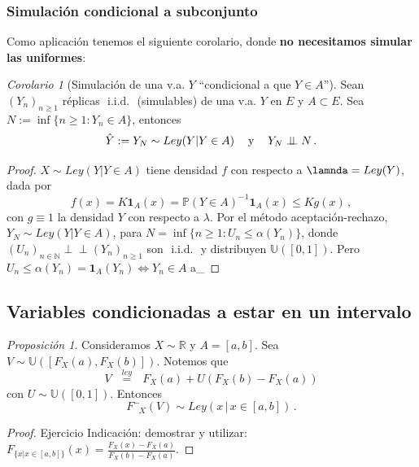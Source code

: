 \documentclass[letterpaper,11pt]{article} %
\def\espacio{\hspace{.25cm}\,}
\theoremstyle{defbreak}
\theoremstyle{propbreak}
\theoremstyle{remark}
\theoremstyle{break}
\newtheorem{proposition}{Proposición}[subsection]
\newtheorem{corolary}{Corolario}[subsection]
\def\R{\mathbb{R}}
\def\P{\mathbb{P}}
\def\N{\mathbb{N}}
\def\unif{\mathbb{U}([0,1])}
\newcommand{\indep}{\perp \!\!\! \perp}
\def\ejercicio{\color{blue}Ejercicio\color{black}}
\def\iid{\mbox{ i.i.d. }}
\def\gris{\color{mygray}}
\def\negro{\color{black}}
\def\findem{\null\hfill\color{white}a\color{black}_\square}
\def\Finvgen{F^-_{\mbox{ }X}}
\def\igualley{\mbox{ }\overset{ley}{=}\mbox{ }}
\begin{document}
\subsubsection{Simulación condicional a subconjunto}
Como aplicación tenemos el siguiente corolario, donde \textbf{no necesitamos simular las uniformes}:
\begin{corolary}[Simulación de una v.a. $Y$  ``condicional a que $Y\in A$'']
\label{corclase7}
\newline Sean $(Y_n)_{n\geq 1}$ réplicas $\iid$ (simulables) de una v.a. $Y$ en $E$ y $A\subset E$. Sea $N:=\inf\{n\geq 1: Y_n\in A\}$, entonces
$$ \hat{Y}:=Y_N\sim Ley(Y|Y\in A) \espacio \mbox{ y }\espacio Y_N\indep N \, .$$
\end{corolary}
\begin{proof}
\gris
$X\sim Ley(Y|Y\in A)$ tiene densidad $f$ con respecto a $\lamnda=Ley(Y)$, dada por
$$ f(x) = K\mathbf{1}_A(x) = \P(Y\in A)^{-1}\mathbf{1}_A(x)\leq K g(x) \, ,$$
con $g\equiv 1$ la densidad $Y$ con respecto a $\lambda$.  Por el método aceptación-rechazo, $Y_N\sim Ley(Y|Y\in A)$, para $N=\inf\{n\geq1:U_n\leq\alpha(Y_n)\}$, donde $(U_n)_{n\in\N}\indep (Y_n)_{n\geq1}$ son $\iid$ y distribuyen $\unif$. Pero $U_n\leq\alpha(Y_n)=\mathbf{1}_A(Y_n)\Longleftrightarrow Y_n\in A$
\findem
\negro
\end{proof}

\subsection{Variables condicionadas a estar en un intervalo}
\begin{proposition}
Consideramos $X\sim \R$ y $A=[a,b]$. Sea $V\sim\mathbb{U}([F_X(a),F_X(b)])$.
Notemos que 
$$V\igualley F_X(a)+U(F_X(b)-F_X(a))$$
con $U\sim \unif$. Entonces
$$ \Finvgen (V) \sim Ley(x \, |\, x\in[a,b]) \, .$$
\end{proposition}
\begin{proof}
\ejercicio
\newline \gris Indicación: demostrar y utilizar: $F_{\{x|x\in[a,b]\}}(x)=\displaystyle\frac{F_X(x)-F_X(a)}{F_X(b)-F_X(a)}$. \negro
\end{proof}
\vspace{1cm}
\end{document}
